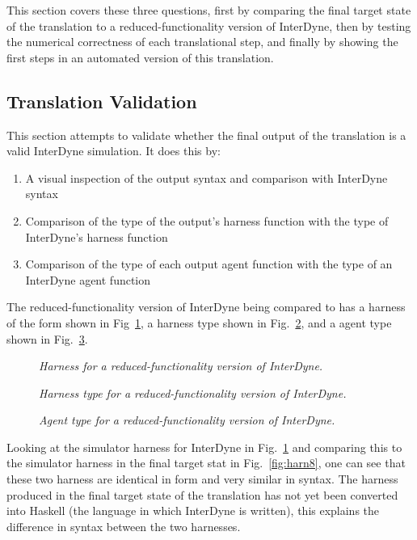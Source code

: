 \documentclass{article}
\begin{document}
This section covers these three questions, first by comparing the final target state of the translation to a reduced-functionality version of InterDyne, then by testing the numerical correctness of each translational step, and finally by showing the first steps in an automated version of this translation.  


\subsection{Translation Validation}
This section attempts to validate whether the final output of the translation is a valid InterDyne simulation. It does this by:
\begin{enumerate}
  \item A visual inspection of the output syntax and comparison with InterDyne syntax
  \item Comparison of the type of the output's harness function with the type of InterDyne's harness function
  \item Comparison of the type of each output agent function with the type of an InterDyne agent function
\end{enumerate}

The  reduced-functionality version of InterDyne being compared to has a harness of the form shown in Fig~\ref{fig:harntypinharnes}, a harness type shown in Fig.~\ref{fig:harntypint}, and a agent type shown in Fig.~\ref{fig:agentpint}.
\begin{figure}[H]
	\centering
	
	\caption{\it Harness for a reduced-functionality version of InterDyne.}
	\label{fig:harntypinharnes} 
\end{figure} 
\begin{figure}[H]
	\centering
	
	\caption{\it Harness type for a reduced-functionality version of InterDyne.}
	\label{fig:harntypint}
\end{figure} 
\begin{figure}[H]
	\centering
	
	\caption{\it Agent type for a reduced-functionality version of InterDyne.}
	\label{fig:agentpint}
\end{figure} 

Looking at the simulator harness for InterDyne in Fig.~\ref{fig:harntypinharnes} and comparing this to the simulator harness in the final target stat in Fig.~\ref{fig:harn8}, one can see that these two harness are identical in form and very similar in syntax. The harness produced in the final target state of the translation has not yet been converted into Haskell (the language in which InterDyne is written), this explains the difference in syntax between the two harnesses. 
\end{document}
